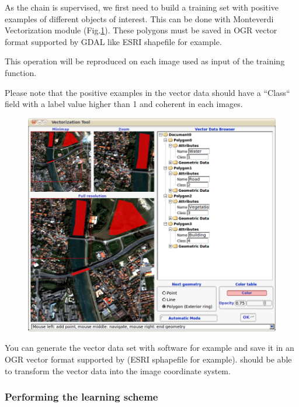 As the chain is supervised, we first need to build a training set with
positive examples of different objects of interest. This can be done
with Monteverdi Vectorization module
(Fig.\ref{fig:vectoModuleDataSetCreation}).
These polygons must be saved in OGR vector format supported
by GDAL like ESRI shapefile for example.

This operation will be reproduced on each image used as input of the training
function.

Please note that the positive examples in the vector data should have a ``Class``
field with a label value higher than 1 and coherent in each images.

\begin{figure}
  \center
  \includegraphics[width=1\textwidth]{../Art/MonteverdiImages/monteverdi_vectorization_module_for_classification.png}
  \label{fig:vectoModuleDataSetCreation}
\end{figure}

You can generate the vector data set with \qgis software for
example and save it in an OGR vector format supported by \gdal (ESRI
sphapefile for example). \app should be able to transform the
vector data into the image coordinate system.

\subsubsection{Performing the learning scheme}

